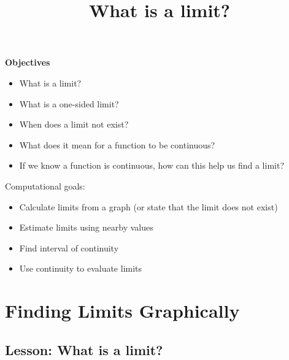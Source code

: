 \documentclass{ximera}
\title{What is a limit?}
\newenvironment{objectives}{\begin{remark}\textbf{Objectives}\\}{\end{remark}}
\begin{document}
\begin{abstract}
\end{abstract}

\maketitle


\begin{objectives}


\begin{itemize}
    \item What is a limit?
    \item What is a one-sided limit?
    \item When does a limit not exist?
    \item What does it mean for a function to be continuous?
    \item If we know a function is continuous, how can this help us find a limit?
\end{itemize}

Computational goals:

\begin{itemize}
    \item Calculate limits from a graph (or state that the limit does not exist)
    \item Estimate limits using nearby values
    \item Find interval of continuity
    \item Use continuity to evaluate limits
\end{itemize}


\end{objectives}

\section{Finding Limits Graphically}
\subsection{Lesson: What is a limit?}

\begin{center}  
\end{center}
\end{document}
